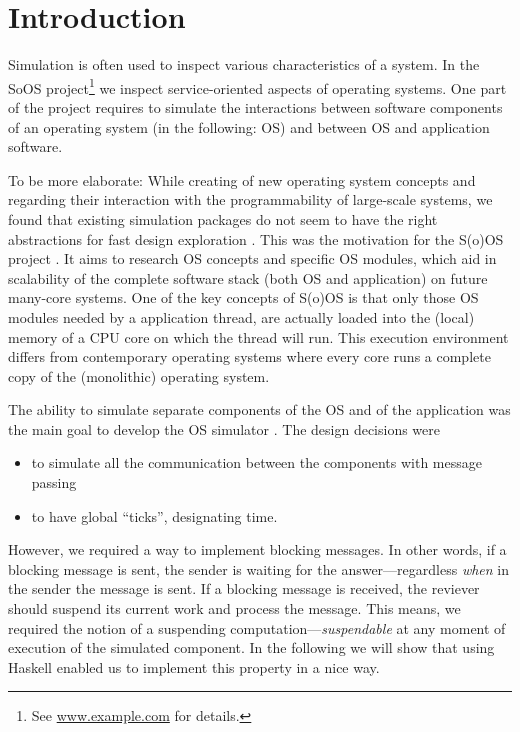 \section{Introduction}

Simulation is often used to inspect various characteristics of a system.
In the SoOS project\footnote{See \url{www.example.com} for details.} we
inspect service-oriented aspects of operating systems. One part of the
project requires to simulate the interactions between software
components of an operating system (in the following: OS) and between
OS and application software.

To be more elaborate: While creating of new operating system concepts
and regarding their interaction with the programmability of
large-scale systems, we found that existing simulation packages do not
seem to have the right abstractions for fast design exploration
\cite{cotson,omnet}. This was the motivation for the S(o)OS project
\cite{soos}.  It aims to research OS concepts and specific OS modules,
which aid in scalability of the complete software stack (both OS and
application) on future many-core systems.  One of the key concepts of
S(o)OS is that only those OS modules needed by a application thread,
are actually loaded into the (local) memory of a CPU core on which the
thread will run.  This execution environment differs from contemporary
operating systems where every core runs a complete copy of the
(monolithic) operating system.

The ability to simulate separate components of the OS and of the
application was the main goal to develop the OS simulator \soosim
{}. 
 The design decisions were
\begin{itemize}
\item to simulate all the communication between the components with
  message passing
\item to have global ``ticks'', designating time.
\end{itemize}
However, we required a way to implement blocking messages. In other
words, if a blocking message is sent, the sender is waiting for the
answer---regardless \emph{when} in the sender the message is sent. If
a blocking message is received, the reviever should suspend its
current work and process the message. This
means, we required the notion of a suspending
computation---\emph{suspendable} at any moment of execution of the
simulated component. In the following we will show that using Haskell
\cite{haskell-report} enabled us to implement this property in a nice
way.

